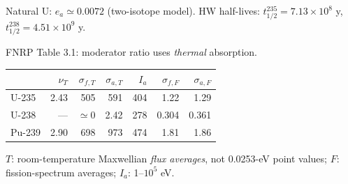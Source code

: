 \begin{handoutcolumns}
\par{}\vspace{2pt}
Natural U: $e_a\simeq0.0072$ (two-isotope model).
HW half-lives: $t_{1/2}^{235}=7.13\times10^8$ y,
$t_{1/2}^{238}=4.51\times10^9$ y.
\par{}\vspace{2pt}
FNRP Table 3.1: moderator ratio uses \emph{thermal} absorption.
\par\vspace{2pt}
{\centering\fontsize{8}{9.2}\selectfont
\begin{tabular}{@{}lrrrrrr@{}}
\toprule
 & $\nu_T$ & $\sigma_{f,T}$ & $\sigma_{a,T}$ & $I_a$ & $\sigma_{f,F}$ & $\sigma_{a,F}$\\
\midrule
U-235 & 2.43 & 505 & 591 & 404 & 1.22 & 1.29\\
U-238 & --- & $\simeq0$ & 2.42 & 278 & 0.304 & 0.361\\
Pu-239 & 2.90 & 698 & 973 & 474 & 1.81 & 1.86\\
\bottomrule
\end{tabular}\par}
$T$: room-temperature Maxwellian \emph{flux averages}, not 0.0253-eV
point values; $F$: fission-spectrum averages; $I_a$: 1--$10^5$ eV.


\end{handoutcolumns}
